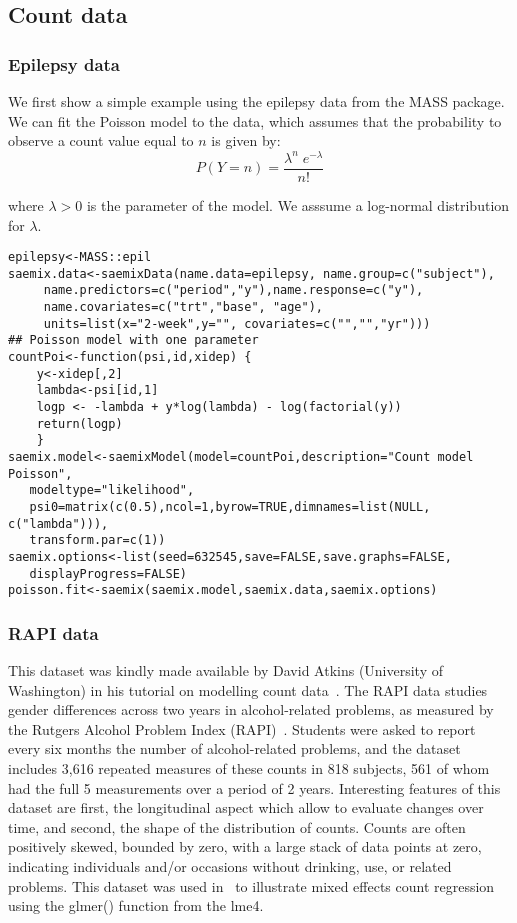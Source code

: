 \subsection{Count data} 

\subsubsection{Epilepsy data} \label{sec:epilepsyCount}

We first show a simple example using the {\sf epilepsy} data from the {\sf MASS} package. We can fit the Poisson model to the data, which assumes that the probability to observe a count value equal to $n$ is given by:
\begin{equation}
P(Y=n) = \frac{\lambda^n \; e^{-\lambda}}{n!}
\end{equation}

where $\lambda>0$ is the parameter of the model. We asssume a log-normal distribution for $\lambda$.

\begin{verbatim}
epilepsy<-MASS::epil
saemix.data<-saemixData(name.data=epilepsy, name.group=c("subject"),
     name.predictors=c("period","y"),name.response=c("y"),
     name.covariates=c("trt","base", "age"), 
     units=list(x="2-week",y="", covariates=c("","","yr")))
## Poisson model with one parameter
countPoi<-function(psi,id,xidep) { 
    y<-xidep[,2]
    lambda<-psi[id,1]
    logp <- -lambda + y*log(lambda) - log(factorial(y))
    return(logp)
    }
saemix.model<-saemixModel(model=countPoi,description="Count model Poisson",
   modeltype="likelihood", 
   psi0=matrix(c(0.5),ncol=1,byrow=TRUE,dimnames=list(NULL, c("lambda"))), 
   transform.par=c(1))
saemix.options<-list(seed=632545,save=FALSE,save.graphs=FALSE, 
   displayProgress=FALSE)
poisson.fit<-saemix(saemix.model,saemix.data,saemix.options)
\end{verbatim}


\subsubsection{RAPI data} \label{sec:RAPICount}

This dataset was kindly made available by David Atkins (University of Washington) in his tutorial on modelling count data~\cite{Atkins13}. The RAPI data studies gender differences across two years in alcohol-related problems, as measured by the Rutgers Alcohol Problem Index (RAPI)~\cite{White89}. Students were asked to report every six months the number of alcohol-related problems, and the dataset includes 3,616 repeated measures of these counts in 818 subjects, 561 of whom had the full 5 measurements over a period of 2 years. Interesting features of this dataset are first, the longitudinal aspect which allow to evaluate changes over time, and second, the shape of the distribution of counts. Counts are often positively skewed, bounded by zero, with a large stack of data points at zero, indicating individuals and/or occasions without drinking, use, or related problems. This dataset was used in~\cite{Atkins13} to illustrate mixed effects count regression using the {\sf glmer()} function from the {\sf lme4}.

